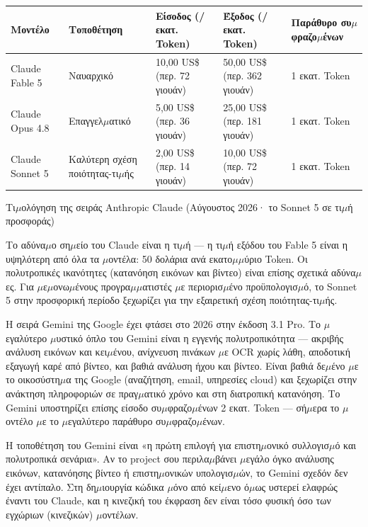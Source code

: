 \begin{center}
\begin{tabularx}{\linewidth}{|X|X|X|X|X|}
\hline
\textbf{Μοντέλο} & \textbf{Τοποθέτηση} & \textbf{Είσοδος (/εκατ. Token)} & \textbf{Έξοδος (/εκατ. Token)} & \textbf{Παράθυρο συ$\mu$φραζο$\mu$ένων} \tabularnewline
\hline
Claude Fable 5 & Ναυαρχικό & 10,00 US\$ (περ. 72 γιουάν) & 50,00 US\$ (περ. 362 γιουάν) & 1 εκατ. Token \tabularnewline
Claude Opus 4.8 & Επαγγελ$\mu$ατικό & 5,00 US\$ (περ. 36 γιουάν) & 25,00 US\$ (περ. 181 γιουάν) & 1 εκατ. Token \tabularnewline
Claude Sonnet 5 & Καλύτερη σχέση ποιότητας-τι$\mu$ής & 2,00 US\$ (περ. 14 γιουάν) & 10,00 US\$ (περ. 72 γιουάν) & 1 εκατ. Token \tabularnewline
\hline
\end{tabularx}
\end{center}

\begin{center}\small\color{gray}Τι$\mu$ολόγηση της σειράς Anthropic Claude (Αύγουστος 2026· το Sonnet 5 σε τι$\mu$ή προσφοράς)\end{center}

Το αδύνα$\mu$ο ση$\mu$είο του Claude είναι η τι$\mu$ή — η τι$\mu$ή εξόδου του Fable 5 είναι η υψηλότερη από όλα τα $\mu$οντέλα: 50 δολάρια ανά εκατο$\mu$$\mu$ύριο Token. Οι πολυτροπικές ικανότητες (κατανόηση εικόνων και βίντεο) είναι επίσης σχετικά αδύνα$\mu$ες. Για $\mu$ε$\mu$ονω$\mu$ένους προγρα$\mu$$\mu$ατιστές $\mu$ε περιορισ$\mu$ένο προϋπολογισ$\mu$ό, το Sonnet 5 στην προσφορική περίοδο ξεχωρίζει για την εξαιρετική σχέση ποιότητας-τι$\mu$ής.


Η σειρά Gemini της Google έχει φτάσει στο 2026 στην έκδοση 3.1 Pro. Το $\mu$εγαλύτερο $\mu$υστικό όπλο του Gemini είναι η εγγενής πολυτροπικότητα — ακριβής ανάλυση εικόνων και κει$\mu$ένου, ανίχνευση πινάκων $\mu$ε OCR χωρίς λάθη, αποδοτική εξαγωγή καρέ από βίντεο, και βαθιά ανάλυση ήχου και βίντεο. Είναι βαθιά δε$\mu$ένο $\mu$ε το οικοσύστη$\mu$α της Google (αναζήτηση, email, υπηρεσίες cloud) και ξεχωρίζει στην ανάκτηση πληροφοριών σε πραγ$\mu$ατικό χρόνο και στη διατροπική κατανόηση. Το Gemini υποστηρίζει επίσης είσοδο συ$\mu$φραζο$\mu$ένων 2 εκατ. Token — σή$\mu$ερα το $\mu$οντέλο $\mu$ε το $\mu$εγαλύτερο παράθυρο συ$\mu$φραζο$\mu$ένων.

Η τοποθέτηση του Gemini είναι «η πρώτη επιλογή για επιστη$\mu$ονικό συλλογισ$\mu$ό και πολυτροπικά σενάρια». Αν το project σου περιλα$\mu$βάνει $\mu$εγάλο όγκο ανάλυσης εικόνων, κατανόησης βίντεο ή επιστη$\mu$ονικών υπολογισ$\mu$ών, το Gemini σχεδόν δεν έχει αντίπαλο. Στη δη$\mu$ιουργία κώδικα $\mu$όνο από κεί$\mu$ενο ό$\mu$ως υστερεί ελαφρώς έναντι του Claude, και η κινεζική του έκφραση δεν είναι τόσο φυσική όσο των εγχώριων (κινεζικών) $\mu$οντέλων.

